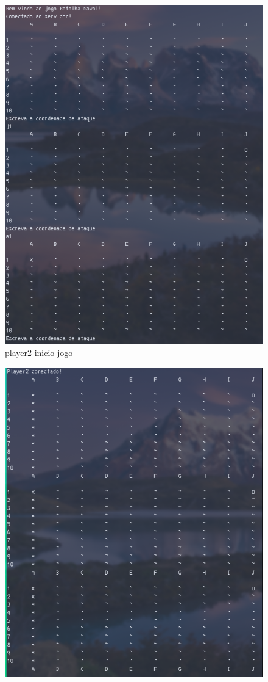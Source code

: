 \documentclass[
	12pt,				%
	oneside,			%
	a4paper,			%
	english,			%
	brazil,				%
	]{abntex2}
\begin{document}
{\begin{figure}[H]
    \centering
    \includegraphics[width=1\textwidth]{imgs/player2-inicio-jogo}
    \caption{player2-inicio-jogo}
    \label{fig:img1}
\end{figure}
\begin{figure}[H]
    \centering
    \includegraphics[width=1\textwidth]{imgs/player1-inicio-jogo}

\end{figure}}
\end{document}

